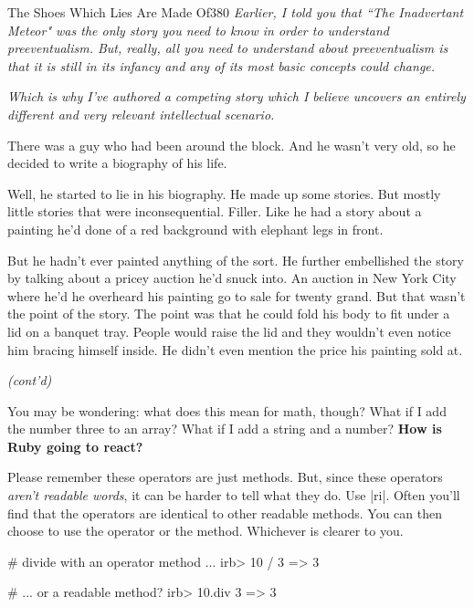 \documentclass[12pt,twoside]{report}
\begin{document}
	\begin{sidebar}{The Shoes Which Lies Are Made Of}{380}
		\textit{Earlier, I told you that ``The Inadvertant Meteor" was the only story you need to know in order to understand preeventualism. But, really, all you need to understand about preeventualism is that it is still in its infancy and any of its most basic concepts could change.}\vspace{6pt}
		
		\textit{Which is why I've authored a competing story which I believe uncovers an entirely different and very relevant intellectual scenario.}\vspace{6pt}

		There was a guy who had been around the block. And he wasn't very old, so he decided to write a biography of his life.\vspace{6pt}

		Well, he started to lie in his biography. He made up some stories. But mostly little stories that were inconsequential. Filler. Like he had a story about a painting he'd done of a red background with elephant legs in front.\vspace{6pt}

		But he hadn't ever painted anything of the sort. He further embellished the story by talking about a pricey auction he'd snuck into. An auction in New York City where he'd he overheard his painting go to sale for twenty grand. But that wasn't the point of the story. The point was that he could fold his body to fit under a lid on a banquet tray. People would raise the lid and they wouldn't even notice him bracing himself inside. He didn't even mention the price his painting sold at.\vspace{6pt}

		\textit{(cont'd)}\vspace{6pt}
	\end{sidebar}

You may be wondering: what does this mean for math, though?  What if I
add the number three to an array?  What if I add a string and a
number?  {\bf How is Ruby going to react?}

Please remember these operators are just methods.  But, since these
operators {\em aren't readable words}, it can be harder to tell what
they do.  Use \rubyinline|ri|.  Often you'll find that
the operators are identical to other readable methods.  You can then
choose to use the operator or the method. Whichever is clearer to you.


\begin{consolecode}

 # divide with an operator method ...
 irb> 10 / 3
   => 3

 # ... or a readable method?
 irb> 10.div 3
   => 3

\end{consolecode}
\end{document}

